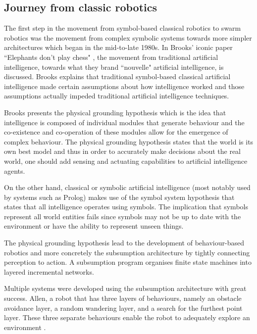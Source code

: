 \subsection{Journey from classic robotics}
\label{journeyfromtraditionalAI}

The first step in the movement from symbol-based classical robotics to swarm robotics was the movement from complex symbolic systems towards more simpler architectures which began in the mid-to-late 1980s. In Brooks' iconic paper ``Elephants don't play chess" \cite{brooks1990elephants}, the movement from traditional artificial intelligence, towards what they brand ``nouvelle" artificial intelligence, is discussed. Brooks explains that traditional symbol-based classical artificial intelligence made certain assumptions about how intelligence worked and those assumptions actually impeded traditional artificial intelligence techniques. 

Brooks presents the physical grounding hypothesis which is the idea that intelligence is composed of individual modules that generate behaviour and the co-existence and co-operation of these modules allow for the emergence of complex behaviour. The physical grounding hypothesis states that the world is its own best model and thus in order to accurately make decisions about the real world, one should add sensing and actuating capabilities to artificial intelligence agents.

On the other hand, classical or symbolic artificial intelligence (most notably used by systems such as Prolog) makes use of the symbol system hypothesis that states that all intelligence operates using symbols. The implication that symbols represent all world entities fails since symbols may not be up to date with the environment or have the ability to represent unseen things. 

The physical grounding hypothesis lead to the development of behaviour-based robotics and more concretely the subsumption architecture \cite{brooks1986robust} by tightly connecting perception to action. A subsumption program organises finite state machines into layered incremental networks. 

Multiple systems were developed using the subsumption architecture with great success. Allen, a robot that has three layers of behaviours, namely an obstacle avoidance layer, a random wandering layer, and a search for the furthest point layer. These three separate behaviours enable the robot to adequately explore an environment \cite{brooks1986robust}.

